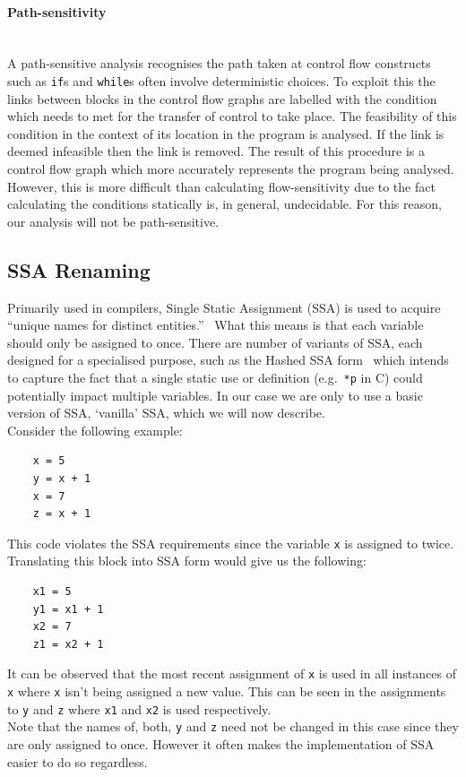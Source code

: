 \documentclass[12pt, titlepage]{article}
\begin{document}
\paragraph*{Path-sensitivity}\mbox{} \\
A path-sensitive analysis recognises the path taken at control flow constructs such as \texttt{if}s and \texttt{while}s often involve deterministic choices. To exploit this the links between blocks in the control flow graphs are labelled with the condition which needs to met for the transfer of control to take place. The feasibility of this condition in the context of its location in the program is analysed. If the link is deemed infeasible then the link is removed. The result of this procedure is a control flow graph which more accurately represents the program being analysed. However, this is more difficult than calculating flow-sensitivity due to the fact calculating the conditions statically is, in general, undecidable. For this reason, our analysis will not be path-sensitive.

\subsection{SSA Renaming}
Primarily used in compilers, Single Static Assignment (SSA) is used to acquire ``unique names for distinct entities.''~\cite{ssaBook} What this means is that each variable should only be assigned to once. There are number of variants of SSA, each designed for a specialised purpose, such as the Hashed SSA form~\cite{ssaBook} which intends to capture the fact that a single static use or definition (e.g.\ \texttt{*p} in C) could potentially impact multiple variables. In our case we are only to use a basic version of SSA, `vanilla' SSA, which we will now describe. \\
Consider the following example:
\begin{lstlisting}
    x = 5
    y = x + 1
    x = 7
    z = x + 1
\end{lstlisting}
This code violates the SSA requirements since the variable \texttt{x} is assigned to twice. Translating this block into SSA form would give us the following:
\begin{lstlisting}
    x1 = 5
    y1 = x1 + 1
    x2 = 7
    z1 = x2 + 1
\end{lstlisting}
It can be observed that the most recent assignment of \texttt{x}  is used in all instances of \texttt{x} where \texttt{x} isn't being assigned a new value. This can be seen in the assignments to \texttt{y} and \texttt{z} where \texttt{x1} and \texttt{x2} is used respectively. \\
Note that the names of, both, \texttt{y} and \texttt{z} need not be changed in this case since they are only assigned to once. However it often makes the implementation of SSA easier to do so regardless.
\end{document}
